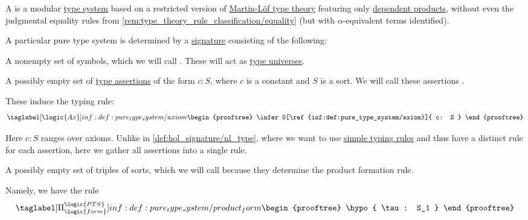 \begin{definition}\label{def:pure_type_system}
  A  is a modular \hyperref[def:abstract_type_system]{type system} based on a restricted version of \hyperref[def:martin_lof_type_theory]{Martin-L\"of type theory} featuring only \hyperref[def:dependent_product]{dependent products}, without even the judgmental equality rules from \cref{rem:type_theory_rule_classification/equality} (but with \( \alpha \)-equivalent terms identified).

  A particular pure type system is determined by a \hyperref[con:logical_system_signature]{signature} consisting of the following:
  \begin{thmenum}
     A nonempty set of symbols, which we will call . These will act as \hyperref[con:type_universe]{type universes}.

     A possibly empty set of \hyperref[def:type_assertion]{type assertions} of the form \( c: S \), where \( c \) is a constant and \( S \) is a sort. We will call these assertions .

    These induce the typing rule:
    \begin{equation*}\taglabel[\logic{Ax}]{inf:def:pure_type_system/axiom}
      \begin{prooftree}
        \infer0[\ref{inf:def:pure_type_system/axiom}]{ c: S }
      \end{prooftree}
    \end{equation*}

    Here \( c: S \) ranges over axioms. Unlike in \cref{def:hol_signature/nl_type}, where we want to use \hyperref[def:simple_typing_rule]{simple typing rules} and thus have a distinct rule for each assertion, here we gather all assertions into a single rule.

     A possibly empty set of triples of sorts, which we will call  because they determine the product formation rule.

    Namely, we have the rule
    \begin{equation*}\taglabel[\ensuremath{ \Pi_{\logic{form}}^{\logic{PTS}} }]{inf:def:pure_type_system/product_form}
      \begin{prooftree}
        \hypo{ \tau: S_1 }


\end{prooftree}
\end{equation*}
\end{thmenum}
\end{definition}
